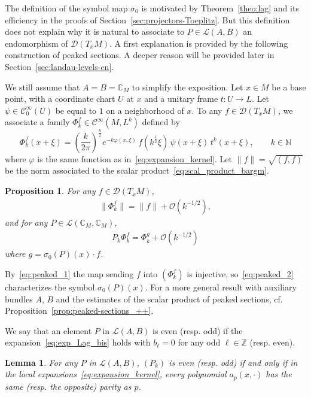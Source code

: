\documentclass[10pt,a4paper]{article}
\newtheorem{lemm}[theo]{Lemma}
\newtheorem{prop}[theo]{Proposition}
\theoremstyle{definition}
\numberwithin{equation}{section}
\newcommand{\N}{{\mathbb{N}}}
\newcommand{\C}{{\mathbb{C}}}
\newcommand{\Z}{{\mathbb{Z}}}
\newcommand{\si}{{\sigma}}
\newcommand{\Ci}{{\mathcal{C}}^{\infty}}
\newcommand{\bigo}{\mathcal{O}}
\newcommand{\D}{\mathcal{D}}
\newcommand{\lag}{\mathcal{L}}
\begin{document}
The definition of the symbol map $\si_0$ is motivated by Theorem~\ref{theo:lag} and its efficiency in the proofs of Section~\ref{sec:projectors-Toeplitz}. But this definition does not explain why it is natural to associate to $P \in \lag (A,B)$ an endomorphism of $\D (T_xM)$. A first explanation is provided by the following construction of peaked sections. A deeper reason will be provided later in Section~\ref{sec:landau-levels-cn}.

We still assume that $A = B = \C_M$ to simplify the exposition. Let $x \in M$ be a base point, with a coordinate chart $U$ at $x$ and a unitary frame $t: U \rightarrow L$. Let $\psi \in \Ci_0(U)$ be equal to $1$ on a neighborhood of $x$. To any $f \in \D (T_xM)$, we associate a family $\Phi_k^f \in \Ci (M, L^k)$ defined by
\[
\Phi_k^f (x+\xi) = \left(\frac{k}{2\pi} \right)^{\frac{n}{2}} e^{-k
\varphi(x,\xi)} \, f\left(k^{\frac{1}{2}} \xi\right) \, \psi (x+\xi) \, t
^k(x+\xi), \qquad k \in \N
\]
where $\varphi$ is the same function as in~\eqref{eq:expansion_kernel}.  Let $\| f \| = \sqrt{(f,f)}$ be the norm associated to the scalar product~\eqref{eq:scal_product_bargm}. 

\begin{prop}\label{prop:peaked-sections}
For any $f \in \D (T_xM)$,
\begin{gather}\label{eq:peaked_1}
\| \Phi^f_k \| = \| f \| + \bigo \left(k^{-1/2}\right),
\end{gather}
and for any $P \in \lag (\C_M, \C_M)$,
\begin{gather}\label{eq:peaked_2}
P_k \Phi^f_k = \Phi^g_k + \bigo \left(k^{-1/2}\right)
\end{gather}
where $g = \si_0(P)(x) \cdot f$.
\end{prop}

By~\eqref{eq:peaked_1} the map sending $f$ into $(\Phi_k^f)$ is injective, so~\eqref{eq:peaked_2} characterizes the symbol $\si_0 (P) (x)$. For a more general result with auxiliary bundles $A$, $B$ and the estimates of the scalar product of peaked sections, cf. Proposition~\ref{prop:peaked-sections_++}.

We say that an element $P$ in $\lag (A,B)$ is even (resp. odd) if the expansion~\eqref{eq:exp_Lag_bis} holds with $b_{\ell } = 0$ for any odd $\ell \in \Z$ (resp. even).

\begin{lemm}\label{lem:parite}
For any $P$ in $\lag (A,B)$, $(P_k)$ is even (resp. odd) if and only if in the local expansions~\eqref{eq:expansion_kernel}, every polynomial $a_p(x,\cdot)$ has the same (resp. the opposite) parity as $p$.
\end{lemm}
\end{document}
